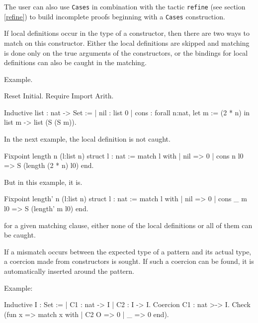The user can also use \texttt{Cases} in combination with the tactic
\texttt{refine} (see section \ref{refine}) to build incomplete proofs
beginning with a \texttt{Cases} construction.


If local definitions occur in the type of a constructor, then there
are two ways to match on this constructor. Either the local
definitions are skipped and matching is done only on the true arguments
of the constructors, or the bindings for local definitions can also
be caught in the matching.

Example.

\begin{coq_eval}
Reset Initial.
Require Import Arith.
\end{coq_eval}

\begin{coq_example*}
Inductive list : nat -> Set :=
  | nil : list 0
  | cons : forall n:nat, let m := (2 * n) in list m -> list (S (S m)).
\end{coq_example*}

In the next example, the local definition is not caught.

\begin{coq_example}
Fixpoint length n (l:list n) {struct l} : nat :=
  match l with
  | nil => 0
  | cons n l0 => S (length (2 * n) l0)
  end.
\end{coq_example}

But in this example, it is.

\begin{coq_example}
Fixpoint length' n (l:list n) {struct l} : nat :=
  match l with
  | nil => 0
  | cons _ m l0 => S (length' m l0)
  end.
\end{coq_example}

\Rem for a given matching clause, either none of the local
definitions or all of them can be caught.


If a mismatch occurs between the expected type of a pattern and its
actual type, a coercion made from constructors is sought. If such a
coercion can be found, it is automatically inserted around the
pattern.

Example:

\begin{coq_example}
Inductive I : Set :=
  | C1 : nat -> I
  | C2 : I -> I.
Coercion C1 : nat >-> I.
Check (fun x => match x with
                | C2 O => 0
                | _ => 0
                end).
\end{coq_example}


